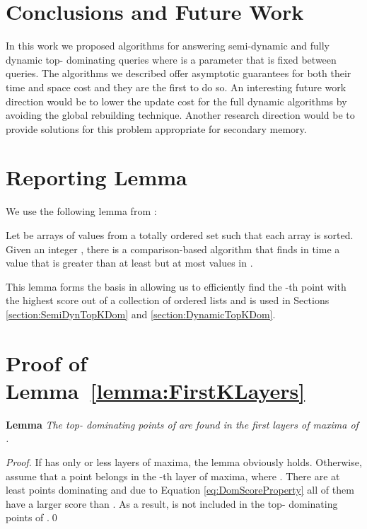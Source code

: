 \documentclass{llncs}
\begin{document}
\section{Conclusions and Future Work} \label{section:ConclusionsFutureWork}
In this work we proposed algorithms for answering semi-dynamic and fully dynamic top- dominating queries where  is a parameter that is fixed between queries. The algorithms we described offer asymptotic guarantees for both their time and space cost and they are the first to do so. An interesting future work direction would be to lower the update cost for the full dynamic algorithms by avoiding the global rebuilding technique. Another research direction would be to provide solutions for this problem appropriate for secondary memory.





\newpage
\appendix

\section{Reporting Lemma}

We use the following lemma from \cite{Frederickson82}:
\begin{lemma}\label{lemma:TopKDomLemma}
    Let  be arrays of values from a totally ordered set such that each array is sorted.
    Given an integer , there is a comparison-based algorithm that finds in  time a value  that is greater than at least  but at most  values in .
\end{lemma}

This lemma forms the basis in allowing us to efficiently find the -th point with the highest score out of a collection of ordered lists and is used in Sections \ref{section:SemiDynTopKDom} and \ref{section:DynamicTopKDom}.


\section{Proof of Lemma~\ref{lemma:FirstKLayers}} \label{app:lemma1}

\textbf{Lemma} \textit{The top- dominating points of  are found in the first  layers of maxima of .}

\begin{proof}
If  has only  or less layers of maxima, the lemma obviously holds. Otherwise, assume that a point  belongs in the -th layer of maxima, where . There are at least  points dominating  and due to Equation \ref{eq:DomScoreProperty} all of them have a larger score than . As a result,  is not included in the top- dominating points of .\qed
\end{proof}
\end{document}
